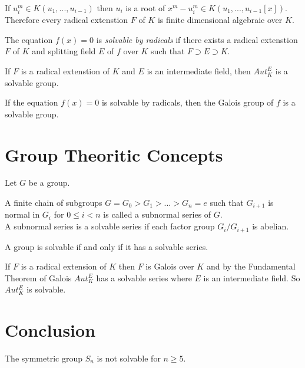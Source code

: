 \begin{remark}
If \(u_i^m \in K(u_1,...,u_{i-1})\) then \(u_i\) is a root of \(x^m-u_i^m \in K(u_1,...,u_{i-1}[x])\). \\
Therefore every radical extenstion \(F\) of \(K\) is finite dimensional algebraic over \(K\).
\end{remark}

\begin{definition}
The equation \(f(x)=0\) is \textit{solvable by radicals} if there exists a radical extenstion \(F\) of \(K\) and splitting field \(E\) of \(f\) over \(K\) such that \(F \supset E \supset K\).
\end{definition}

\begin{theorem}
If \(F\) is a radical extenstion of \(K\) and \(E\) is an intermediate field, then \(Aut_K^E\) is a solvable group.
\end{theorem}

\begin{corollary}
If the equation \(f(x)=0\) is solvable by radicals, then the Galois group of \(f\) is a solvable group.
\end{corollary}

\section{Group Theoritic Concepts}
Let \(G\) be a group. 

\begin{definition}
A finite chain of subgroups \(G=G_0>G_1>...>G_n={e}\) such that \(G_{i+1}\) is normal in \(G_i\) for \(0 \leq i < n\) is called a subnormal series of \(G\).\\
A subnormal series is a solvable series if each factor group \(G_i/G_{i+1}\) is abelian.
\end{definition}

\begin{definition}
A group is solvable if and only if it has a solvable series.
\end{definition}

If \(F\) is a radical extension of \(K\) then \(F\) is Galois over \(K\) and by the Fundamental Theorem of Galois \(Aut_K^E\) has a solvable series where \(E\) is an intermediate field. So \(Aut_K^E\) is solvable.

\section{Conclusion}
\begin{theorem}
The symmetric group \(S_n\) is not solvable for \(n \geq 5\).
\end{theorem}

